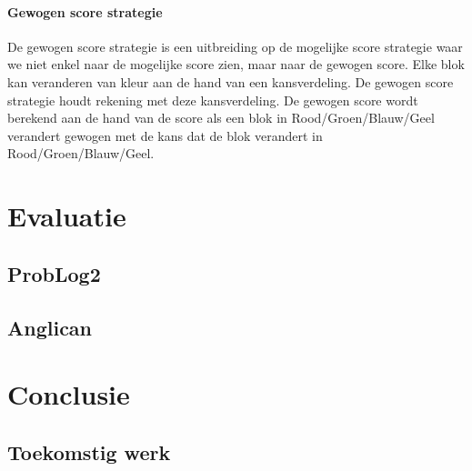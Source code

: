 \documentclass[12pt,a4paper,oneside]{book}
\theoremstyle{definition}
\begin{document}
\subsubsection{Gewogen score strategie}
De gewogen score strategie is een uitbreiding op de mogelijke score strategie waar we niet enkel naar de mogelijke score zien, maar naar de gewogen score. Elke blok kan veranderen van kleur aan de hand van een kansverdeling. De gewogen score strategie houdt rekening met deze kansverdeling. De gewogen score wordt berekend aan de hand van de score als een blok in Rood/Groen/Blauw/Geel verandert gewogen met de kans dat de blok verandert in Rood/Groen/Blauw/Geel.

\chapter{Evaluatie}
\section{ProbLog2}
\section{Anglican}

\chapter{Conclusie}
\section{Toekomstig werk}



\end{document}
